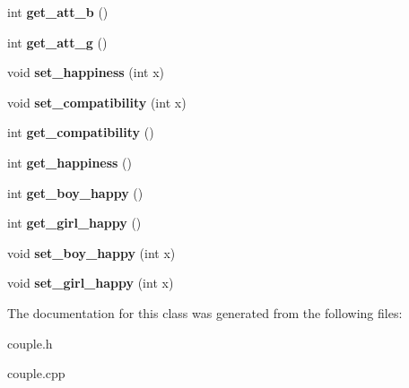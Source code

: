 \begin{DoxyCompactItemize}
\item 
int {\bfseries get\+\_\+att\+\_\+b} ()\hypertarget{classcouple_af6e0cb3d7c85db517cdbbbc017cdb5b5}{}\label{classcouple_af6e0cb3d7c85db517cdbbbc017cdb5b5}

\item 
int {\bfseries get\+\_\+att\+\_\+g} ()\hypertarget{classcouple_a7769c5145fc3c9801724aa366220f96d}{}\label{classcouple_a7769c5145fc3c9801724aa366220f96d}

\item 
void {\bfseries set\+\_\+happiness} (int x)\hypertarget{classcouple_a858f07be055abb5929044123dca613a0}{}\label{classcouple_a858f07be055abb5929044123dca613a0}

\item 
void {\bfseries set\+\_\+compatibility} (int x)\hypertarget{classcouple_a85eed7e20dc17cc50b84a8c43cf32591}{}\label{classcouple_a85eed7e20dc17cc50b84a8c43cf32591}

\item 
int {\bfseries get\+\_\+compatibility} ()\hypertarget{classcouple_ace03a4be9e6b52b132ef0679d23722e4}{}\label{classcouple_ace03a4be9e6b52b132ef0679d23722e4}

\item 
int {\bfseries get\+\_\+happiness} ()\hypertarget{classcouple_a3eb4ea973454953573955addea341aab}{}\label{classcouple_a3eb4ea973454953573955addea341aab}

\item 
int {\bfseries get\+\_\+boy\+\_\+happy} ()\hypertarget{classcouple_afc112ae1b47ab7f8cd5c2559e9faaacc}{}\label{classcouple_afc112ae1b47ab7f8cd5c2559e9faaacc}

\item 
int {\bfseries get\+\_\+girl\+\_\+happy} ()\hypertarget{classcouple_a7e13bb6ed2ffc6ee0b123af297728f73}{}\label{classcouple_a7e13bb6ed2ffc6ee0b123af297728f73}

\item 
void {\bfseries set\+\_\+boy\+\_\+happy} (int x)\hypertarget{classcouple_ab44566083411aec9296c8a638f1ca6c5}{}\label{classcouple_ab44566083411aec9296c8a638f1ca6c5}

\item 
void {\bfseries set\+\_\+girl\+\_\+happy} (int x)\hypertarget{classcouple_a04bcf19d9b3f7b8e3e6983c2ab700a2c}{}\label{classcouple_a04bcf19d9b3f7b8e3e6983c2ab700a2c}

\end{DoxyCompactItemize}


The documentation for this class was generated from the following files\+:\begin{DoxyCompactItemize}
\item 
couple.\+h\item 
couple.\+cpp\end{DoxyCompactItemize}
